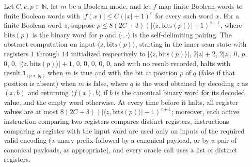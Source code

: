 \begin{lemma}
\label{Complexity.comp_inner_run}
\leanok
{}
Let $C,e,p\in\mathbb N$, let $m$ be a Boolean mode, and let $f$ map finite Boolean words
to finite Boolean words with $|f(x)|\le C(|x|+1)^e$ for every such word $x$. For a
finite Boolean word $z$, suppose $p\le 8(2C+3)(|\langle
z,\mathrm{bits}(p)\rangle|+1)^{e+1}$, where $\mathrm{bits}(p)$ is the binary word for
$p$ and $\langle\cdot,\cdot\rangle$ is the self-delimiting pairing. The abstract
computation on input $\langle z,\mathrm{bits}(p)\rangle$, starting in the inner scan
state with registers $1$ through $14$ initialized respectively to $|\langle
z,\mathrm{bits}(p)\rangle|$, $2|z|+2$, $2|z|$, $0$, $p$, $0$, $0$, $|\langle
z,\mathrm{bits}(p)\rangle|+1$, $0$, $0$, $0$, $0$, $0$, and with no result recorded,
halts with result $\mathbf{1}_{\{p<|q|\}}$ when $m$ is true and with the bit at position
$p$ of $q$ (false if that position is absent) when $m$ is false, where $q$ is the word
obtained by decoding $z$ as $(x,b)$ and returning $\langle f(x),b\rangle$ if $b$ is the
canonical binary word for its decoded value, and the empty word otherwise. At every time
before it halts, all register values are at most $8(2C+3)(|\langle
z,\mathrm{bits}(p)\rangle|+1)^{e+1}$; moreover, each active instruction comparing two
registers compares distinct registers, instructions comparing a register with the input
word are used only on inputs of the required valid encoding (a unary prefix followed by
a canonical payload, or by a pair of canonical payloads, as appropriate), and every
oracle call uses a list of distinct registers.
\end{lemma}

